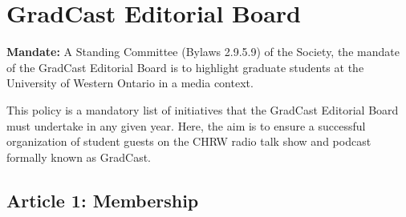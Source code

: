 \section{GradCast Editorial Board}

\textbf{Mandate:} A Standing Committee (Bylaws 2.9.5.9) of the Society, the mandate of the GradCast Editorial Board is to highlight graduate students at the University of Western Ontario in a media context.

This policy is a mandatory list of initiatives that the GradCast Editorial Board must undertake in any given year. Here, the aim is to ensure a successful organization of student guests on the CHRW radio talk show and podcast formally known as GradCast.

\subsection{Article 1: Membership} 
